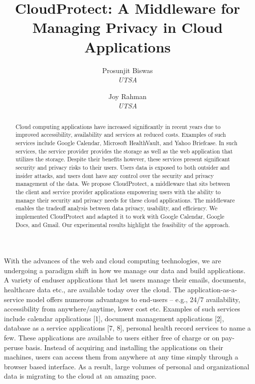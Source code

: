 \documentclass[11pt,onecolumn]{article}
\begin{document}
%
\title{CloudProtect: A Middleware for Managing Privacy in Cloud Applications}



\author{
 Prosunjit Biswas\\
 \textit{UTSA}
\and
 Joy Rahman\\
 \textit{UTSA}
}


\maketitle


\begin{abstract}
Cloud computing applications have increased significantly in recent years due to improved
accessibility, availability and services at reduced costs. Examples of such
services include Google Calendar, Microsoft HealthVault, and Yahoo Briefcase. In
such services, the service provider provides the storage as well as the web application
that utilizes the storage. Despite their benefits however, these services present
significant security and privacy risks to their users. Users data is exposed to both
outsider and insider attacks, and users dont have any control over the security and
privacy management of the data. We propose CloudProtect, a middleware that sits
between the client and service provider applications empowering users with the ability
to manage their security and privacy needs for these cloud applications. The middleware
enables the tradeoff analysis between data privacy, usability, and efficiency.
We implemented CloudProtect and adapted it to work with Google Calendar, Google
Docs, and Gmail. Our experimental results highlight the feasibility of the approach.
\end{abstract}



With the advances of the web and cloud computing technologies, we are undergoing a
paradigm shift in how we manage our data and build applications. A variety of enduser
applications that let users manage their emails, documents, healthcare data etc.,
are available today over the cloud. The application-as-a-service model offers numerous
advantages to end-users – e.g., 24/7 availability, accessibility from anywhere/anytime,
lower cost etc. Examples of such services include calendar applications [1],
document management applications [2], database as a service applications
[7, 8], personal health record services to name a few. These applications are
available to users either free of charge or on pay-peruse basis. Instead of acquiring and
installing the applications on their machines, users can access them from anywhere
at any time simply through a browser based interface. As a result, large volumes of
personal and organizational data is migrating to the cloud at an amazing pace.
\end{document}
